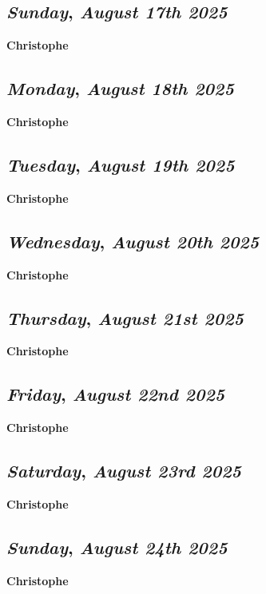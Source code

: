 \def\day{\textit{August 17th 2025}}
\def\weekday{\textit{Sunday}}
\subsection*{\weekday, \day}
\textbf {Christophe}

\def\day{\textit{August 18th 2025}}
\def\weekday{\textit{Monday}}
\subsection*{\weekday, \day}
\textbf {Christophe}

\def\day{\textit{August 19th 2025}}
\def\weekday{\textit{Tuesday}}
\subsection*{\weekday, \day}
\textbf {Christophe}

\def\day{\textit{August 20th 2025}}
\def\weekday{\textit{Wednesday}}
\subsection*{\weekday, \day}
\textbf {Christophe}

\def\day{\textit{August 21st 2025}}
\def\weekday{\textit{Thursday}}
\subsection*{\weekday, \day}
\textbf {Christophe}

\def\day{\textit{August 22nd 2025}}
\def\weekday{\textit{Friday}}
\subsection*{\weekday, \day}
\textbf {Christophe}

\def\day{\textit{August 23rd 2025}}
\def\weekday{\textit{Saturday}}
\subsection*{\weekday, \day}
\textbf {Christophe}

\def\day{\textit{August 24th 2025}}
\def\weekday{\textit{Sunday}}
\subsection*{\weekday, \day}
\textbf {Christophe}

\def\day{\textit{August 25th 2025}}
\def\weekday{\textit{Monday}}

